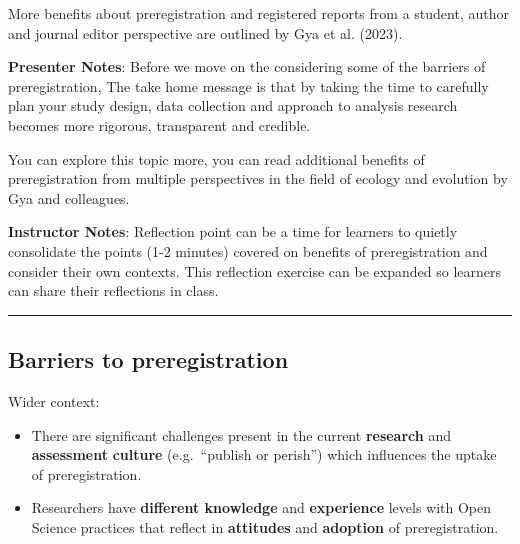 \documentclass[
  letterpaper,
  DIV=11,
  numbers=noendperiod]{scrartcl}
\begin{document}
\begin{tcolorbox}[enhanced jigsaw, arc=.35mm, bottomrule=.15mm, bottomtitle=1mm, breakable, colback=white, colbacktitle=quarto-callout-tip-color!10!white, colframe=quarto-callout-tip-color-frame, coltitle=black, left=2mm, leftrule=.75mm, opacityback=0, opacitybacktitle=0.6, rightrule=.15mm, title=\textcolor{quarto-callout-tip-color}{\faLightbulb}\hspace{0.5em}{Find out more}, titlerule=0mm, toprule=.15mm, toptitle=1mm]

More benefits about preregistration and registered reports from a
student, author and journal editor perspective are outlined by Gya et
al. (2023).

\end{tcolorbox}

\textbf{Presenter Notes}: Before we move on the considering some of the
barriers of preregistration, The take home message is that by taking the
time to carefully plan your study design, data collection and approach
to analysis research becomes more rigorous, transparent and credible.

You can explore this topic more, you can read additional benefits of
preregistration from multiple perspectives in the field of ecology and
evolution by Gya and colleagues.

\textbf{Instructor Notes}: Reflection point can be a time for learners
to quietly consolidate the points (1-2 minutes) covered on benefits of
preregistration and consider their own contexts. This reflection
exercise can be expanded so learners can share their reflections in
class.

\begin{center}\rule{0.5\linewidth}{0.5pt}\end{center}

\subsection{Barriers to
preregistration}\label{barriers-to-preregistration}

Wider context:

\begin{itemize}
\item
  There are significant challenges present in the current
  \textbf{research} and \textbf{assessment} \textbf{culture}
  (e.g.~``publish or perish'') which influences the uptake of
  preregistration.
\item
  Researchers have \textbf{different knowledge} and \textbf{experience}
  levels with Open Science practices that reflect in \textbf{attitudes}
  and \textbf{adoption} of preregistration.
\end{itemize}
\end{document}

